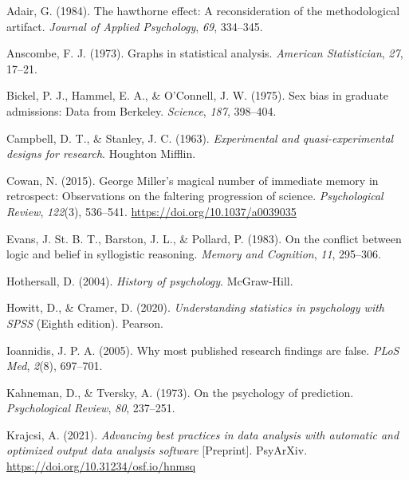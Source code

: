 \documentclass[
  11pt,
]{book}
\newlength{\cslhangindent}
\newlength{\cslentryspacingunit} %
\newenvironment{CSLReferences}[2] %
 {%
  \setlength{\parindent}{0pt}
  \ifodd #1
  \let\oldpar\par
  \def\par{\hangindent=\cslhangindent\oldpar}
  \fi
  \setlength{\parskip}{#2\cslentryspacingunit}
 }%
 {}
\theoremstyle{definition}
\theoremstyle{definition}
\theoremstyle{definition}
\theoremstyle{definition}
\theoremstyle{remark}
\begin{document}
\hypertarget{refs}{}
\begin{CSLReferences}{1}{0}
\leavevmode{}%
Adair, G. (1984). The hawthorne effect: A reconsideration of the methodological artifact. \emph{Journal of Applied Psychology}, \emph{69}, 334--345.

\leavevmode{}%
Anscombe, F. J. (1973). Graphs in statistical analysis. \emph{American Statistician}, \emph{27}, 17--21.

\leavevmode{}%
Bickel, P. J., Hammel, E. A., \& O'Connell, J. W. (1975). Sex bias in graduate admissions: Data from {B}erkeley. \emph{Science}, \emph{187}, 398--404.

\leavevmode{}%
Campbell, D. T., \& Stanley, J. C. (1963). \emph{Experimental and quasi-experimental designs for research}. Houghton Mifflin.

\leavevmode{}%
Cowan, N. (2015). George {Miller}'s magical number of immediate memory in retrospect: {Observations} on the faltering progression of science. \emph{Psychological Review}, \emph{122}(3), 536--541. \url{https://doi.org/10.1037/a0039035}

\leavevmode{}%
Evans, J. St. B. T., Barston, J. L., \& Pollard, P. (1983). On the conflict between logic and belief in syllogistic reasoning. \emph{Memory and Cognition}, \emph{11}, 295--306.

\leavevmode{}%
Hothersall, D. (2004). \emph{History of psychology}. McGraw-Hill.

\leavevmode{}%
Howitt, D., \& Cramer, D. (2020). \emph{Understanding statistics in psychology with {SPSS}} (Eighth edition). {Pearson}.

\leavevmode{}%
Ioannidis, J. P. A. (2005). Why most published research findings are false. \emph{PLoS Med}, \emph{2}(8), 697--701.

\leavevmode{}%
Kahneman, D., \& Tversky, A. (1973). On the psychology of prediction. \emph{Psychological Review}, \emph{80}, 237--251.

\leavevmode{}%
Krajcsi, A. (2021). \emph{Advancing best practices in data analysis with automatic and optimized output data analysis software} {[}Preprint{]}. PsyArXiv. \url{https://doi.org/10.31234/osf.io/hnmsq}


\end{CSLReferences}
\end{document}
